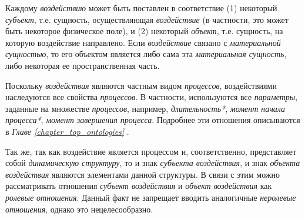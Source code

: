 \begin{SCn}
	\begin{scnindent}
	\end{scnindent}


\end{SCn}

Каждому \textit{воздействию} может быть поставлен в соответствие (1) некоторый \textit{субъект\scnrolesign}, т.е. сущность, осуществляющая \textit{воздействие} (в частности, это может быть некоторое физическое поле), и (2) некоторый \textit{объект\scnrolesign}, т.е. сущность, на которую воздействие направлено. Если \textit{воздействие} связано с \textit{материальной сущностью}, то его объектом является либо сама эта \textit{материальная сущность}, либо некоторая ее пространственная часть.

Поскольку \textit{воздействия} являются частным видом \textit{процессов}, воздействиями наследуются все свойства \textit{процессов}. В частности, используются все \textit{параметры}, заданные на множестве \textit{процессов}, например, \textit{длительность*}, \textit{момент начала процесса*}, \textit{момент завершения процесса\scnsupergroupsign}. Подробнее эти отношения описываются в \textit{Главе \ref{chapter_top_ontologies} }.

Так же, так как воздействие является процессом и, соответственно, представляет собой \textit{динамическую структуру}, то и знак \textit{субъекта воздействия\scnrolesign}, и знак \textit{объекта воздействия\scnrolesign} являются элементами данной структуры. В связи с этим можно рассматривать отношения \textit{субъект воздействия\scnrolesign} и \textit{объект воздействия\scnrolesign} как \textit{ролевые отношения}. Данный факт не запрещает вводить аналогичные \textit{неролевые отношения}, однако это нецелесообразно.


